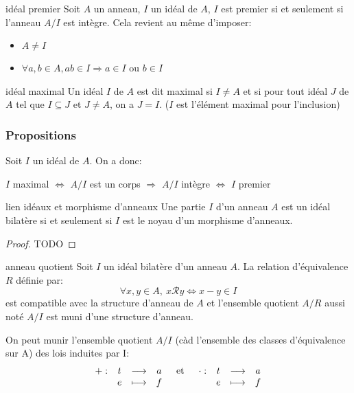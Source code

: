\begin{definition}{idéal premier}{}
    Soit $A$ un anneau, $I$ un idéal de $A$, $I$ est premier si et seulement si l'anneau $A/I$ est intègre.
    Cela revient au même d'imposer:
    \begin{itemize}
        \item $A \neq I$
        \item $\forall a, b \in A, ab \in I \Longrightarrow a \in I$ ou $ b \in I$
    \end{itemize}
\end{definition}

\begin{definition}{idéal maximal}{}
    Un idéal $I$ de $A$ est dit maximal si $I \neq A$ et si pour tout idéal $J$ de $A$ tel que $I \subseteq J$ et $J \neq A$, on a $J = I$.
    ($I$ est l'élément maximal pour l'inclusion)
\end{definition}



\subsubsection{Propositions}

\begin{proposition}{}{}
    Soit $I$ un idéal de $A$. On a donc:
    \begin{center}
        $I$ maximal $\Longleftrightarrow$ $A/I$ est un corps $\Longrightarrow$ $A/I$ intègre $\Longleftrightarrow$ $I$ premier
    \end{center}
\end{proposition}

\begin{theorem}{lien idéaux et morphisme d'anneaux}{}
    Une partie $I$ d'un anneau $A$ est un idéal bilatère si et seulement si $I$
    est le noyau d'un morphisme d'anneaux.
\end{theorem}

\begin{proof}
    TODO
\end{proof}

\begin{proposition}{anneau quotient}{}
    Soit $I$ un idéal bilatère d'un anneau $A$. La relation d'équivalence $R$ définie par:
    \[ \forall x, y \in A, ~ x \mathscr{R} y \Longleftrightarrow x - y \in I \]
    est compatible avec la structure d'anneau de $A$ et l'ensemble quotient $A/R$
    aussi noté $A/I$ est muni d'une structure d'anneau.
    \newline

    On peut munir l'ensemble quotient $A/I$ (càd l'ensemble des classes d'équivalence sur A) des lois induites par I:
    \[ \begin{array}{lcr}
        \begin{array}[t]{cccc}+ : & t & \longrightarrow & a \\ & e & \longmapsto & f\end{array} & \text{et} & \begin{array}[t]{cccc}\cdot : & t & \longrightarrow & a \\ & e & \longmapsto & f\end{array}
    \end{array} \]
\end{proposition}

